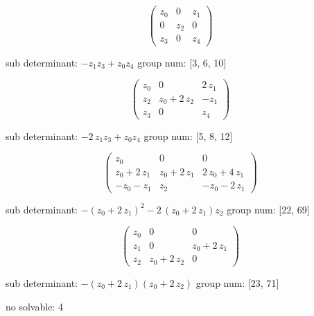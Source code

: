 $$ \left(\begin{array}{rrr}
z_{0} & 0 & z_{1} \\
0 & z_{2} & 0 \\
z_{3} & 0 & z_{4}
\end{array}\right) $$

sub determinant: $ -z_{1} z_{3} + z_{0} z_{4} $
group num: [3, 6, 10]


$$ \left(\begin{array}{rrr}
z_{0} & 0 & 2 \, z_{1} \\
z_{2} & z_{0} + 2 \, z_{2} & -z_{1} \\
z_{3} & 0 & z_{4}
\end{array}\right) $$

sub determinant: $ -2 \, z_{1} z_{3} + z_{0} z_{4} $
group num: [5, 8, 12]



$$ \left(\begin{array}{rrr}
z_{0} & 0 & 0 \\
z_{0} + 2 \, z_{1} & z_{0} + 2 \, z_{1} & 2 \, z_{0} + 4 \, z_{1} \\
-z_{0} - z_{1} & z_{2} & -z_{0} - 2 \, z_{1}
\end{array}\right) $$

sub determinant: $ -{\left(z_{0} + 2 \, z_{1}\right)}^{2} - 2 \, {\left(z_{0} + 2 \, z_{1}\right)} z_{2} $
group num: [22, 69]


$$ \left(\begin{array}{rrr}
z_{0} & 0 & 0 \\
z_{1} & 0 & z_{0} + 2 \, z_{1} \\
z_{2} & z_{0} + 2 \, z_{2} & 0
\end{array}\right) $$

sub determinant: $ -{\left(z_{0} + 2 \, z_{1}\right)} {\left(z_{0} + 2 \, z_{2}\right)} $
group num: [23, 71]


no solvable: 4
